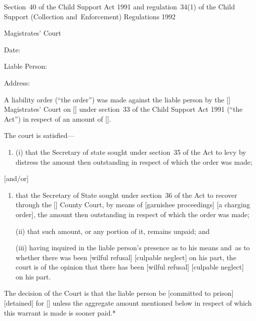 \documentclass[12pt,a4paper]{article}
\begin{document}
\renewcommand\parthead{--- Schedule~3}

\noindent
Section~40 of the Child Support Act 1991 and regulation~34(1) of the Child Support (Collection and~Enforcement) Regulations 1992

\medskip

{\raggedleft \hspace{0.5\linewidth}\dotfill Magistrates' Court

}

\medskip

Date:

\medskip

Liable Person:

\medskip

Address:

\medskip

A liability order (``the order'') was made against the liable person by the [\phantom{Bolton}] Magistrates' Court on [\phantom{\today}] under section~33 of the Child Support Act 1991 (``the Act'') in respect of an amount of [\phantom{£100.00}].

The court is satisfied---
\begin{enumerate}
\item[]
(i) that the Secretary of state sought under section~35 of the Act to levy by distress the amount then outstanding in respect of which the order was made;
\end{enumerate}
[and/or]
\begin{enumerate}\item[]
that the Secretary of State sought under section~36 of the Act to recover through the [\phantom{Bolton}] County Court, by means of [garnishee proceedings] 
[a charging order], the amount then outstanding in respect of which the order was made;

(ii) that such amount, or any portion of it, remains unpaid; and

(iii) having inquired in the liable person's presence as to his means and~as to whether there was been [wilful refusal] 
[culpable neglect] on his part, the court is of the opinion that there has been [wilful refusal] 
[culpable neglect] on his part.
\end{enumerate}

The decision of the Court is that the liable person be [committed to prison] [detained] for [\phantom{7 days}] unless the aggregate amount mentioned below in respect of which this warrant is made is sooner paid.*
\end{document}
